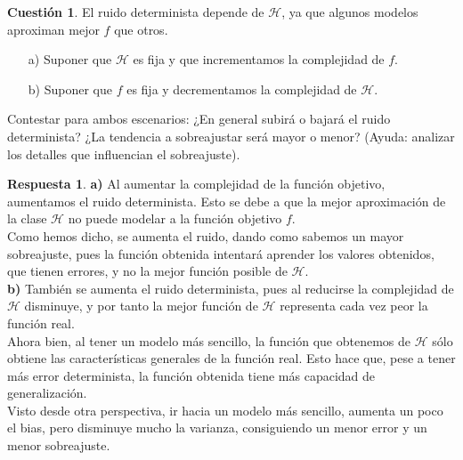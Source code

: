 \documentclass[10pt,a4paper]{article}
\theoremstyle{definition}
\newtheorem{cuestion}{Cuestión}
\newtheorem*{respuesta}{Respuesta}
\begin{document}
\begin{cuestion}
El ruido determinista depende de $\mathcal{H}$, ya que algunos modelos aproximan mejor $f$ que otros.
\begin{enumerate}
\item[a)] Suponer que $\mathcal{H}$ es fija y que incrementamos la complejidad de $f$.
\item[b)] Suponer que $f$ es fija y decrementamos la complejidad de $\mathcal{H}$.
\end{enumerate}
Contestar para ambos escenarios: ¿En general subirá o bajará el ruido determinista? ¿La tendencia a sobreajustar será mayor o menor? (Ayuda: analizar los detalles que influencian el sobreajuste).
\end{cuestion}
\begin{respuesta}
\textbf{a)} Al aumentar la complejidad de la función objetivo, aumentamos el ruido determinista. Esto se debe a que la mejor aproximación de la clase $\mathcal{H}$ no puede modelar a la función objetivo $f$.\\

Como hemos dicho, se aumenta el ruido, dando como sabemos un mayor sobreajuste, pues la función obtenida intentará aprender los valores obtenidos, que tienen errores, y no la mejor función posible de $\mathcal{H}$.\\

\textbf{b)} También se aumenta el ruido determinista, pues al reducirse la complejidad de $\mathcal{H}$ disminuye, y por tanto la mejor función de $\mathcal{H}$ representa cada vez peor la función real.\\
 
Ahora bien, al tener un modelo más sencillo, la función que obtenemos de $\mathcal{H}$ sólo obtiene las características generales de la función real. Esto hace que, pese a tener más error determinista, la función obtenida tiene más capacidad de generalización.\\

Visto desde otra perspectiva, ir hacia un modelo más sencillo, aumenta un poco el bias, pero disminuye mucho la varianza, consiguiendo un menor error y un menor sobreajuste.\\

\end{respuesta}
\end{document}
